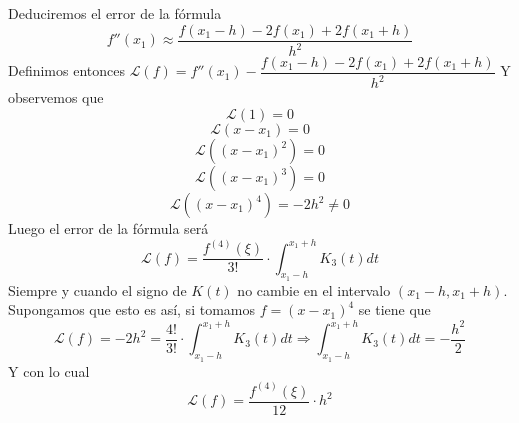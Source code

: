         \begin{ejem}
        Deduciremos el error de la fórmula
        $$f''(x_1)\approx\dfrac{f(x_1-h)-2f(x_1)+2f(x_1+h)}{h^2}$$
        Definimos entonces 
        $\mathcal{L}(f)=f''(x_1)-\dfrac{f(x_1-h)-2f(x_1)+2f(x_1+h)}{h^2}$
        Y observemos que
        $$\mathcal{L}(1)=0$$
        $$\mathcal{L}(x-x_1)=0$$
        $$\mathcal{L}((x-x_1)^2)=0$$
        $$\mathcal{L}((x-x_1)^3)=0$$
        $$\mathcal{L}((x-x_1)^4)=-2h^2\neq 0$$
        Luego el error de la fórmula será
        $$\mathcal{L}(f)=\dfrac{f^{(4)}(\xi)}{3!}\cdot\int_{x_1-h}^{x_1+h}K_3(t)dt$$
        Siempre y cuando el signo de $K(t)$ no cambie en el intervalo $(x_1-h,x_1+h)$. Supongamos que esto es así, si tomamos $f=(x-x_1)^4$ se tiene que
        $$\mathcal{L}(f)=-2h^2=\dfrac{4!}{3!}\cdot\int_{x_1-h}^{x_1+h}K_3(t)dt\Longrightarrow\int_{x_1-h}^{x_1+h}K_3(t)dt=-\dfrac{h^2}{2}$$
        Y con lo cual
        $$\mathcal{L}(f)=\dfrac{f^{(4)}(\xi)}{12}\cdot h^2$$
        \end{ejem}

